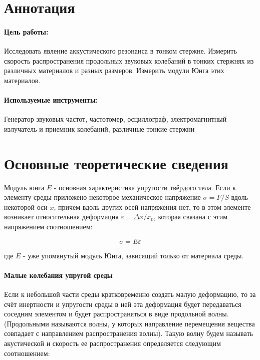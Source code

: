 \documentclass[a4paper,12pt]{article}
\begin{document}
	
	\newpage
	
	\section{Аннотация}
	\paragraph{Цель работы:} \hspace{-4mm} Исследовать явление аккустического резонанса в тонком стержне. Измерить скорость распространения продольных звуковых колебаний в тонких стержнях из различных материалов и разных размеров. Измерить модули Юнга этих материалов.
	\paragraph{Используемые инструменты:} \hspace{-4mm} Генератор звуковых частот, частотомер, осциллограф, электромагнитный излучатель и приемник колебаний, различные тонкие стержни\\
	\section{Основные теоретические сведения}
	Модуль юнга $E$ - основная характеристика упругости твёрдого тела. Если к элементу среды приложено некоторое механическое напряжение $\sigma = F/S$ вдоль некоторой оси $x$, причем вдоль других осей напряжения нет, то в этом элементе возникает относительная деформация $\varepsilon=\Delta x/x_0$, которая связана с этим напряжением соотношением:
	
	\begin{equation}
		\label{sigma}
		\sigma=E\varepsilon
	\end{equation}
	
	где $E$ - уже упомянутый модуль Юнга, зависящий только от материала среды.\\
	
	\paragraph{Малые колебания упругой среды} Если к небольшой части среды кратковременно создать малую деформацию, то за счёт инертности и упругости среды в ней эта деформация будет передаваться соседним элементом и будет распространяться в виде продольной волны. (Продольными называются волны, у которых направление перемещения вещества совпадает с направлением распространения волны). Такую волну будем называть акустической 
	и скорость ее распространения определяется следующим соотношением:
	
\end{document}
